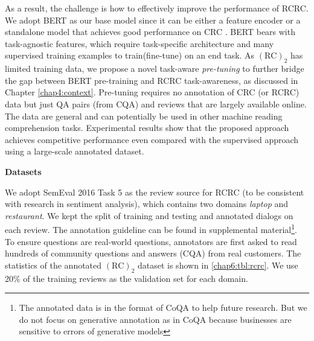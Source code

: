 As a result, the challenge is how to effectively improve the performance of RCRC.
We adopt BERT \cite{devlin2018bert} as our base model since it can be either a feature encoder or a standalone model that achieves good performance on CRC \cite{reddy2018coqa}.
BERT bears with task-agnostic features, which require task-specific architecture and many supervised training examples to train(fine-tune) on an end task.
As $(\text{RC})_2$ has limited training data, 
we propose a novel task-aware \textit{pre-tuning} to further bridge the gap between BERT pre-training and RCRC task-awareness, as discussed in Chapter \ref{chap4:context}.
Pre-tuning requires no annotation of CRC (or RCRC) data but just QA pairs (from CQA) and reviews that are largely available online.
The data are general and can potentially be used in other machine reading comprehension tasks.
Experimental results show that the proposed approach achieves competitive performance even compared with the supervised approach using a large-scale annotated dataset.


\textbf{Datasets}

We adopt SemEval 2016 Task 5
as the review source for RCRC (to be consistent with research in sentiment analysis), which contains two domains \textit{laptop} and \textit{restaurant}.
We kept the split of training and testing and annotated dialogs on each review.
The annotation guideline can be found in supplemental material\footnote{The annotated data is in the format of CoQA \cite{reddy2018coqa} to help future research. But we do not focus on generative annotation as in CoQA because businesses are sensitive to errors of generative models}.
To ensure questions are real-world questions, annotators are first asked to read hundreds of community questions and answers (CQA) from real customers.
The statistics of the annotated $(\text{RC})_2$ dataset is shown in \ref{chap6:tbl:rcrc}.
We use 20\% of the training reviews as the validation set for each domain.

